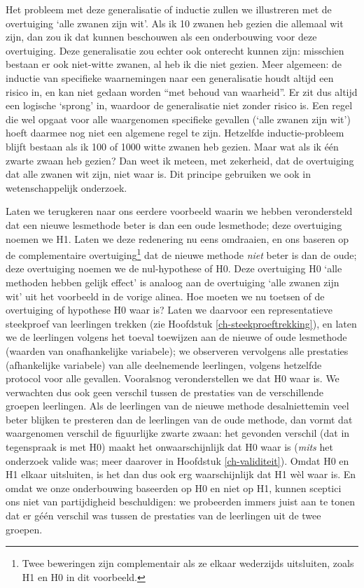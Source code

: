 \documentclass[
]{book}
\begin{document}
Het probleem met deze generalisatie of inductie zullen we illustreren
met de overtuiging `alle zwanen zijn wit'. Als ik 10 zwanen heb gezien
die allemaal wit zijn, dan zou ik dat kunnen beschouwen als een
onderbouwing voor deze overtuiging. Deze generalisatie zou echter ook
onterecht kunnen zijn: misschien bestaan er ook niet-witte zwanen, al
heb ik die niet gezien. Meer algemeen: de inductie van specifieke
waarnemingen naar een generalisatie houdt altijd een risico in, en kan
niet gedaan worden ``met behoud van waarheid''. Er zit dus altijd een
logische `sprong' in, waardoor de generalisatie niet zonder risico is.
Een regel die wel opgaat voor alle waargenomen specifieke gevallen
(`alle zwanen zijn wit') hoeft daarmee nog niet een algemene regel te
zijn. Hetzelfde inductie-probleem blijft bestaan als ik 100 of 1000
witte zwanen heb gezien. Maar wat als ik één zwarte zwaan heb gezien?
Dan weet ik meteen, met zekerheid, dat de overtuiging dat alle zwanen
wit zijn, niet waar is. Dit principe gebruiken we ook in
wetenschappelijk onderzoek.

Laten we terugkeren naar ons eerdere voorbeeld waarin we hebben
verondersteld dat een nieuwe lesmethode beter is dan een oude
lesmethode; deze overtuiging noemen we H1. Laten we deze redenering nu
eens omdraaien, en ons baseren op de complementaire overtuiging\footnote{Twee beweringen zijn complementair als ze elkaar wederzijds uitsluiten, zoals H1 en H0 in dit voorbeeld.} dat
de nieuwe methode \emph{niet} beter is dan de oude; deze overtuiging noemen
we de nul-hypothese of H0. Deze overtuiging H0 `alle methoden hebben
gelijk effect' is analoog aan de overtuiging `alle zwanen zijn wit' uit
het voorbeeld in de vorige alinea. Hoe moeten we nu toetsen of de
overtuiging of hypothese H0 waar is? Laten we daarvoor een
representatieve steekproef van leerlingen trekken (zie
Hoofdstuk \ref{ch-steekproeftrekking}), en laten we de leerlingen volgens
het toeval toewijzen aan de nieuwe of oude lesmethode (waarden van
onafhankelijke variabele); we observeren vervolgens alle prestaties
(afhankelijke variabele) van alle deelnemende leerlingen, volgens
hetzelfde protocol voor alle gevallen. Vooralsnog veronderstellen we dat
H0 waar is. We verwachten dus ook geen verschil tussen de prestaties van
de verschillende groepen leerlingen. Als de leerlingen van de nieuwe
methode desalniettemin veel beter blijken te presteren dan de leerlingen
van de oude methode, dan vormt dat waargenomen verschil de figuurlijke
zwarte zwaan: het gevonden verschil (dat in tegenspraak is met H0) maakt
het onwaarschijnlijk dat H0 waar is (\emph{mits} het onderzoek valide was;
meer daarover in Hoofdstuk \ref{ch-validiteit}). Omdat H0 en H1 elkaar
uitsluiten, is het dan dus ook erg waarschijnlijk dat H1 wèl waar is. En
omdat we onze onderbouwing baseerden op H0 en niet op H1, kunnen
sceptici ons niet van partijdigheid beschuldigen: we probeerden immers
juist aan te tonen dat er géén verschil was tussen de prestaties van de
leerlingen uit de twee groepen.
\end{document}
